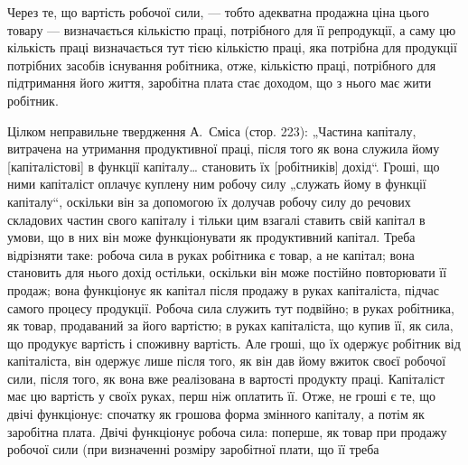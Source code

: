 Через те, що вартість робочої сили, — тобто адекватна продажна ціна цього товару — визначається
кількістю праці, потрібного для її репродукції, а саму цю кількість праці визначається тут тією
кількістю праці, яка потрібна для продукції потрібних засобів існування робітника, отже, кількістю
праці, потрібного для підтримання його життя, заробітна плата стає доходом, що з нього має жити
робітник.

Цілком неправильне твердження А.~Сміса (стор. 223): „Частина капіталу, витрачена на утримання
продуктивної праці, після того як вона служила йому [капіталістові] в функції капіталу\dots{} становить
їх [робітників] дохід“. Гроші, що ними капіталіст оплачує куплену ним робочу силу „служать йому в
функції капіталу“, оскільки він за допомогою їх долучав робочу силу до речових складових частин
свого капіталу і тільки цим взагалі ставить свій капітал в умови, що в них він може функціонувати як
продуктивний капітал. Треба відрізняти таке: робоча сила в руках робітника є товар, а не капітал;
вона становить для нього дохід остільки, оскільки він може постійно повторювати її продаж; вона
функціонує як капітал після продажу в руках капіталіста, підчас самого процесу продукції. Робоча
сила служить тут подвійно; в руках робітника, як товар, продаваний за його вартістю; в руках
капіталіста, що купив її, як сила, що продукує вартість і споживну вартість. Але гроші, що їх
одержує робітник від капіталіста, він одержує лише після того, як він дав йому вжиток своєї робочої
сили, після того, як вона вже реалізована в вартості продукту праці. Капіталіст має цю вартість у
своїх руках,
перш ніж оплатить її. Отже, не гроші є те, що двічі функціонує: спочатку як грошова форма змінного
капіталу, а потім як заробітна плата. Двічі функціонує робоча сила: поперше, як товар при продажу
робочої сили (при визначенні розміру заробітної плати, що її треба
\parbreak{}  %
